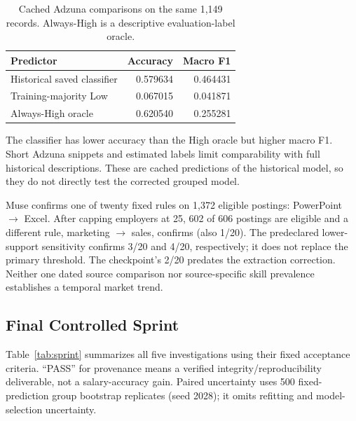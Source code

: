 \documentclass[sigconf,nonacm]{acmart}
\begin{document}
\begin{table}[t]
\caption{Cached Adzuna comparisons on the same 1,149 records. Always-High is a descriptive evaluation-label oracle.}
\label{tab:live}
\centering\small
\begin{tabular}{p{}rr}
\toprule
Predictor & Accuracy & Macro F1 \\
\midrule
Historical saved classifier & 0.579634 & 0.464431 \\
Training-majority Low & 0.067015 & 0.041871 \\
Always-High oracle & 0.620540 & 0.255281 \\
\bottomrule
\end{tabular}
\end{table}

The classifier has lower accuracy than the High oracle but higher macro F1. Short Adzuna snippets and estimated labels limit comparability with full historical descriptions. These are cached predictions of the historical model, so they do not directly test the corrected grouped model.

Muse confirms one of twenty fixed rules on 1,372 eligible postings: PowerPoint $\rightarrow$ Excel. After capping employers at 25, 602 of 606 postings are eligible and a different rule, marketing $\rightarrow$ sales, confirms (also 1/20). The predeclared lower-support sensitivity confirms 3/20 and 4/20, respectively; it does not replace the primary threshold. The checkpoint's 2/20 predates the extraction correction. Neither one dated source comparison nor source-specific skill prevalence establishes a temporal market trend.

\subsection{Final Controlled Sprint}
Table~\ref{tab:sprint} summarizes all five investigations using their fixed acceptance criteria. ``PASS'' for provenance means a verified integrity/reproducibility deliverable, not a salary-accuracy gain. Paired uncertainty uses 500 fixed-prediction group bootstrap replicates (seed 2028); it omits refitting and model-selection uncertainty.
\end{document}
